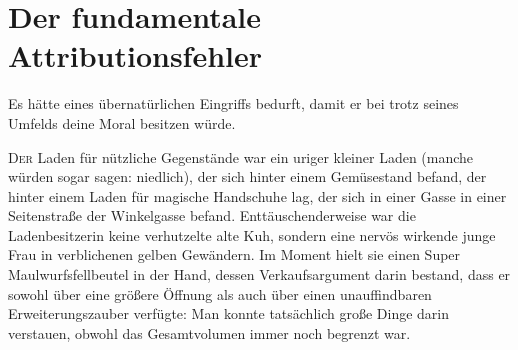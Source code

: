 \chapter{Der fundamentale Attributionsfehler}

\begin{chapterOpeningQuote}
Es hätte eines übernatürlichen Eingriffs bedurft, damit er bei trotz seines Umfelds deine Moral besitzen würde.
\end{chapterOpeningQuote}

\lettrine{D}{er} Laden für nützliche Gegenstände war ein uriger kleiner Laden (manche würden sogar sagen: niedlich), der sich hinter einem Gemüsestand befand, der hinter einem Laden für magische Handschuhe lag, der sich in einer Gasse in einer Seitenstraße der Winkelgasse befand. Enttäuschenderweise war die Ladenbesitzerin keine verhutzelte alte Kuh, sondern eine nervös wirkende junge Frau in verblichenen gelben Gewändern. Im Moment hielt sie einen Super Maulwurfsfellbeutel  in der Hand, dessen Verkaufsargument darin bestand, dass er sowohl über eine größere Öffnung als auch über einen unauffindbaren Erweiterungszauber verfügte: Man konnte tatsächlich große Dinge darin verstauen, obwohl das Gesamtvolumen immer noch begrenzt war.


